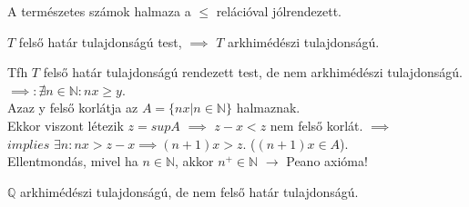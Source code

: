 \documentclass{beamer}
\begin{document}
\begin{frame}

\begin{tcolorbox}[title={Tétel: N rendezése}]
A természetes számok halmaza a $\leq$ relációval jólrendezett.
\end{tcolorbox}

\end{frame}

\begin{frame}

\begin{tcolorbox}[title={Tétel: Felső határ és arkhimédészi tulajdonság}]
$T$ felső határ tulajdonságú test, $\implies$ $T$ arkhimédészi tulajdonságú.
\end{tcolorbox}

\begin{tcolorbox}[title={Bizonyítás (Indirekt)}]
Tfh $T$ felső határ tulajdonságú rendezett test, de nem arkhimédészi tulajdonságú.\\
$\implies : {\nexists}n \in \mathbb{N} : nx \geq y$.\\
Azaz y felső korlátja az $A = \{ nx | n \in \mathbb{N} \}$ halmaznak.\\
Ekkor viszont létezik $z = sup A$ $\implies$ $z - x < z$ nem felső korlát. $\implies$\\
$implies$ ${\exists}n : nx > z - x \implies (n + 1)x > z$. ($(n + 1)x \in A$).\\
Ellentmondás, mivel ha $n \in \mathbb{N}$, akkor $n^+ \in \mathbb{N}$ $\rightarrow$ Peano axióma!
\end{tcolorbox}

\end{frame}

\begin{frame}

\begin{tcolorbox}[title={Tétel: Q nem felső határ tulajdonságú}]
$\mathbb{Q}$ arkhimédészi tulajdonságú, de nem felső határ tulajdonságú.
\end{tcolorbox}

\end{frame}
\end{document}
